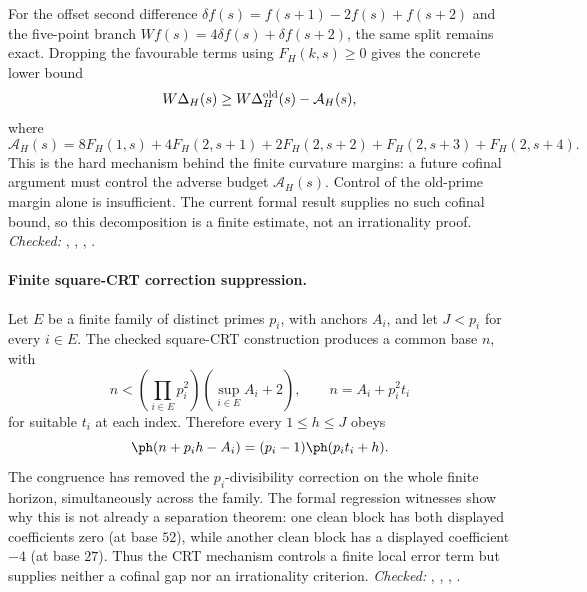 For the offset second difference
\(
 \delta f(s)=f(s+1)-2f(s)+f(s+2)
\)
and the five-point branch
\(Wf(s)=4\delta f(s)+\delta f(s+2)\), the same split remains exact.  Dropping
the favourable terms using \(F_H(k,s)\ge0\) gives the concrete lower bound
\[
 W\Delta_H(s)\ge W\Delta_H^{\rm old}(s)-\mathcal A_H(s),
\]
where
\[
 \mathcal A_H(s)=8F_H(1,s)+4F_H(2,s+1)+2F_H(2,s+2)
                  +F_H(2,s+3)+F_H(2,s+4).
\]
This is the hard mechanism behind the finite curvature margins: a future
cofinal argument must control the adverse budget \(\mathcal A_H(s)\).  Control
of the old-prime margin alone is insufficient.  The current formal result supplies no such cofinal
bound, so this decomposition is a finite estimate, not an irrationality proof.
{\footnotesize\emph{Checked:}
,
,
,
.}

\paragraph{Finite square-CRT correction suppression.}
Let \(E\) be a finite family of distinct primes \(p_i\), with anchors \(A_i\),
and let \(J<p_i\) for every \(i\in E\).  The checked square-CRT construction
produces a common base \(n\), with
\[
 n<\left(\prod_{i\in E}p_i^2\right)(\sup_{i\in E}A_i+2),
 \qquad n=A_i+p_i^2t_i
\]
for suitable \(t_i\) at each index.  Therefore every \(1\le h\le J\) obeys
\[
 \ph(n+p_i h-A_i)=(p_i-1)\ph(p_i t_i+h).
\]
The congruence has removed the \(p_i\)-divisibility correction on the whole
finite horizon, simultaneously across the family.  The formal regression
witnesses show why this is not already a separation theorem: one clean block
has both displayed coefficients zero (at base \(52\)), while another clean
block has a displayed coefficient \(-4\) (at base \(27\)).  Thus the CRT
mechanism controls a finite local error term but supplies neither a cofinal
gap nor an irrationality criterion.
{\footnotesize\emph{Checked:}
,
,
,
.}

